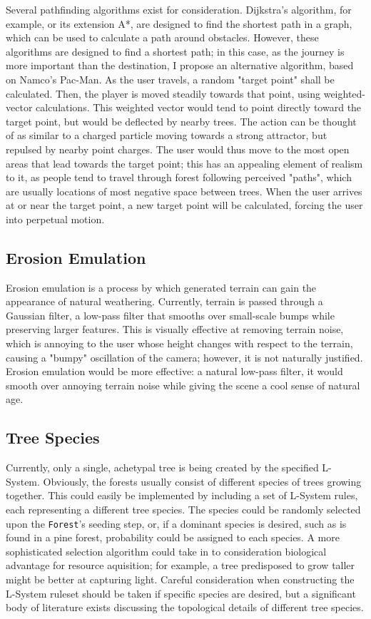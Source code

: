 \documentclass{article}
\newcommand{\tab}{\hspace*{2em}}
\begin{document}
    \tab Several pathfinding algorithms exist for consideration. Dijkstra's algorithm, for example,
or its extension A*, are designed to find the shortest path in a graph, which can be used to
calculate a path around obstacles. However, these algorithms are designed to find a shortest path;
in this case, as the journey is more important than the destination, I propose an alternative
algorithm, based on Namco's Pac-Man\cite{pittman11}. As the user travels, a random "target point"
shall be calculated. Then, the player is moved steadily towards that point, using weighted-vector
calculations. This weighted vector would tend to point directly toward the target point, but would
be deflected by nearby trees. The action can be thought of as similar to a charged particle moving
towards a strong attractor, but repulsed by nearby point charges. The user would thus move to
the most open areas that lead towards the target point; this has an appealing element of realism to
it, as people tend to travel through forest following perceived "paths", which are usually
locations of most negative space between trees. When the user arrives at or near the target point,
a new target point will be calculated, forcing the user into perpetual motion.

        \subsection{Erosion Emulation}
    \tab Erosion emulation\cite{mustgrave89} is a process by which generated terrain can gain the
appearance of natural weathering. Currently, terrain is passed through a Gaussian filter, a
low-pass filter that smooths over small-scale bumps while preserving larger features. This is
visually effective at removing terrain noise, which is annoying to the user whose height changes
with respect to the terrain, causing a "bumpy" oscillation of the camera; however, it is not
naturally justified. Erosion emulation would be more effective: a natural low-pass filter, it would
smooth over annoying terrain noise while giving the scene a cool sense of natural age.

        \subsection{Tree Species}
    \tab Currently, only a single, achetypal tree is being created by the specified L-System.
Obviously, the forests usually consist of different species of trees growing together. This could
easily be implemented by including a set of L-System rules, each representing a different tree
species. The species could be randomly selected upon the \verb|Forest|'s seeding step, or, if a
dominant species is desired, such as is found in a pine forest, probability could be assigned to
each species. A more sophisticated selection algorithm could take in to consideration biological
advantage for resource aquisition; for example, a tree predisposed to grow taller might be better
at capturing light. Careful consideration when constructing the L-System ruleset should be taken if
specific species are desired, but a significant body of literature exists discussing the
topological details of different tree species.
\end{document}
